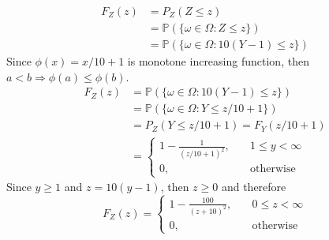 \documentclass[twoside]{article}
\theoremstyle{definition}
\theoremstyle{remark}
\begin{document}
\begin{enumerate}
\begin{enumerate}
    \begin{equation}
      \begin{split}
        F_Z(z)
        &= P_Z(Z \leq z) \\
        &= \mathbb{P}({\{\omega \in \Omega : Z \leq z\}}) \\
        &= \mathbb{P}({\{\omega \in \Omega : 10(Y-1) \leq z\}})
      \end{split}
    \end{equation}
    Since $\phi(x) = x/10 + 1$ is monotone increasing function, then
    $a < b \Rightarrow \phi(a) \leq \phi(b)$.
    \begin{equation}
      \begin{split}
        F_Z(z)
        &= \mathbb{P}({\{\omega \in \Omega : 10(Y-1) \leq z\}}) \\
        &= \mathbb{P}({\{\omega \in \Omega : Y \leq z/10 + 1\}}) \\
        &= P_Z(Y \leq z/10 + 1) = F_Y(z/10 + 1) \\
        &= \left\{
        \begin{array}{ll}
          1 - \frac{1}{(z/10 + 1)^2}, & \quad 1 \leq y < \infty \\
          0,                          & \quad \textrm{otherwise}
        \end{array}
        \right.
      \end{split}
    \end{equation}
    Since $y \geq 1$ and $z = 10(y - 1)$, then $z \geq 0$ and therefore
    \begin{equation}
      F_Z(z)
      = \left\{
      \begin{array}{ll}
        1 - \frac{100}{(z + 10)^2}, & \quad 0 \leq z < \infty \\
        0,                          & \quad \textrm{otherwise}
      \end{array}
      \right.
    \end{equation}
  \end{enumerate}


\end{enumerate}
\end{document}
